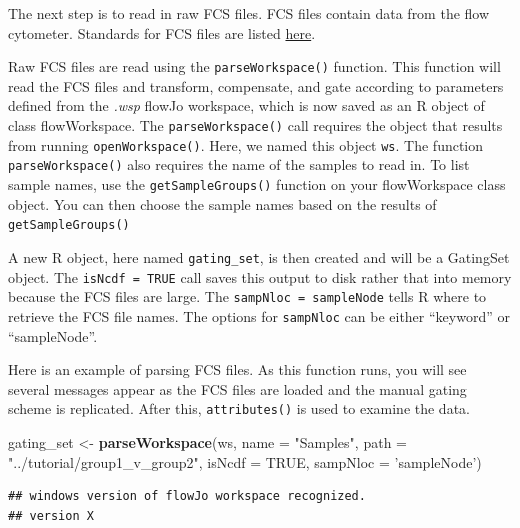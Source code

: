 \documentclass[]{book}
\newenvironment{Shaded}{\begin{snugshade}}{\end{snugshade}}
\newcommand{\DataTypeTok}[1]{\textcolor[rgb]{0.13,0.29,0.53}{#1}}
\newcommand{\KeywordTok}[1]{\textcolor[rgb]{0.13,0.29,0.53}{\textbf{#1}}}
\newcommand{\NormalTok}[1]{#1}
\newcommand{\OtherTok}[1]{\textcolor[rgb]{0.56,0.35,0.01}{#1}}
\newcommand{\StringTok}[1]{\textcolor[rgb]{0.31,0.60,0.02}{#1}}
\begin{document}
The next step is to read in raw FCS files. FCS files contain data from the flow cytometer. Standards for FCS files are listed \href{http://software.broadinstitute.org/cancer/software/genepattern/attachments/fcs_3_1_standard.pdf}{here}.

Raw FCS files are read using the \texttt{parseWorkspace()} function. This function will read the FCS files and transform, compensate, and gate according to parameters defined from the \emph{.wsp} flowJo workspace, which is now saved as an R object of class flowWorkspace. The \texttt{parseWorkspace()} call requires the object that results from running \texttt{openWorkspace()}. Here, we named this object \texttt{ws}. The function \texttt{parseWorkspace()} also requires the name of the samples to read in. To list sample names, use the \texttt{getSampleGroups()} function on your flowWorkspace class object. You can then choose the sample names based on the results of \texttt{getSampleGroups()}

A new R object, here named \texttt{gating\_set}, is then created and will be a GatingSet object. The \texttt{isNcdf\ =\ TRUE} call saves this output to disk rather that into memory because the FCS files are large. The \texttt{sampNloc\ =\ \textquotesingle{}sampleNode\textquotesingle{}} tells R where to retrieve the FCS file names. The options for \texttt{sampNloc} can be either ``keyword'' or ``sampleNode''.

Here is an example of parsing FCS files. As this function runs, you will see several messages appear as the FCS files are loaded and the manual gating scheme is replicated. After this, \texttt{attributes()} is used to examine the data.

\begin{Shaded}
\begin{Highlighting}[]
\NormalTok{gating_set <-}\StringTok{ }\KeywordTok{parseWorkspace}\NormalTok{(ws, }\DataTypeTok{name =} \StringTok{"Samples"}\NormalTok{, }
                             \DataTypeTok{path =} \StringTok{"../tutorial/group1_v_group2"}\NormalTok{, }
                             \DataTypeTok{isNcdf =} \OtherTok{TRUE}\NormalTok{, }\DataTypeTok{sampNloc =} \StringTok{'sampleNode'}\NormalTok{)}
\end{Highlighting}
\end{Shaded}

\begin{verbatim}
## windows version of flowJo workspace recognized.
## version X
\end{verbatim}
\end{document}
